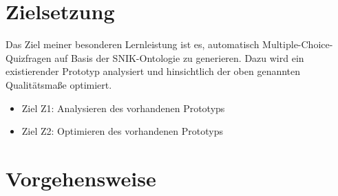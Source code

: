 \documentclass[headsepline,titlepage,ngerman,twoside,12pt]{report}
\newcommand\todo[1]{}%
\begin{document}
\todo{
\begin{itemize}
\item Warum lohnt es sich, die genannten Probleme zu lösen?
\item Wer wird welchen Nutzen von dieser Abschlussarbeit haben?
\item Warum sind die Papers wichtig?
\end{itemize}
Aus den Papers bzw. dem Antrag des Forschungsprojektes entnehmen.
}
\todo{
Worin liegt der zusätzliche Nutzen, die beiden Ansätze zu vergleichen? Worin liegt der Nutzen, den Ansatz des Papers auf die Problematik des Forschungsprojektes anzuwenden?\\
Bsp.: Gelänge es, Daten aus der Krankenversorgung vollständig zu anonymisieren, könnten sie für beliebige Forschungsvorhaben genutzt werden.
}

\section{Zielsetzung}
\label{sec:Ziele}
Das Ziel meiner besonderen Lernleistung ist es, automatisch Multiple-Choice-Quizfragen auf Basis der SNIK-Ontologie zu generieren.
Dazu wird ein existierender Prototyp analysiert und hinsichtlich der oben genannten Qualitätsmaße optimiert.
\begin{itemize}
\item Ziel Z1:  Analysieren des vorhandenen Prototyps
\item Ziel Z2:  Optimieren des vorhandenen Prototyps
\end{itemize}

\section{Vorgehensweise}
\label{sec:Vorgehen}
\todo{
Stellen Sie Ihre Methode bzw. Herangehensweise dar.
Was ist Ihre konkrete Aufgabenstellung im Rahmen der Seminararbeit? Das könnte z.B. sein:
\begin{itemize}
\item Vorstellen verschiedener Lösungsansätze, Vergleich und Bewertung der Lösungsansätze, Literaturrecherche nach weiteren vergleichbaren Papers.
\item Bewertung eines Lösungsansatzes hinsichtlich einer konkreten Forschungssituation.
Literaturrecherche nach weiteren vergleichbaren Papers.
\end{itemize}
}
\end{document}
